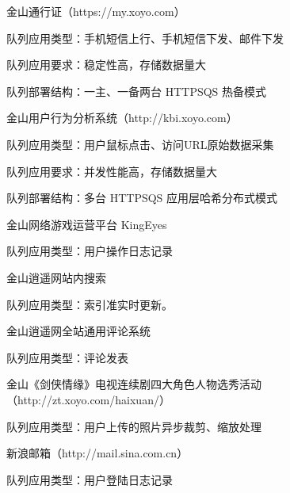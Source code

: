\begin{compactenum}
\item 金山通行证（https://my.xoyo.com）

\begin{compactitem}
\item 队列应用类型：手机短信上行、手机短信下发、邮件下发
\item 队列应用要求：稳定性高，存储数据量大
\item 队列部署结构：一主、一备两台 HTTPSQS 热备模式
\end{compactitem}

\item 金山用户行为分析系统（http://kbi.xoyo.com）

\begin{compactitem}
\item 队列应用类型：用户鼠标点击、访问URL原始数据采集
\item 队列应用要求：并发性能高，存储数据量大
\item 队列部署结构：多台 HTTPSQS 应用层哈希分布式模式
\end{compactitem}

\item 金山网络游戏运营平台 KingEyes

\begin{compactitem}
\item 队列应用类型：用户操作日志记录
\end{compactitem}

\item 金山逍遥网站内搜索

\begin{compactitem}
\item 队列应用类型：索引准实时更新。
\end{compactitem}

\item 金山逍遥网全站通用评论系统

\begin{compactitem}
\item 队列应用类型：评论发表
\end{compactitem}

\item 金山《剑侠情缘》电视连续剧四大角色人物选秀活动（http://zt.xoyo.com/haixuan/）

\begin{compactitem}
\item 队列应用类型：用户上传的照片异步裁剪、缩放处理
\end{compactitem}

\item 新浪邮箱（http://mail.sina.com.cn）

\begin{compactitem}
\item 队列应用类型：用户登陆日志记录
\end{compactitem}
　　
\end{compactenum}




